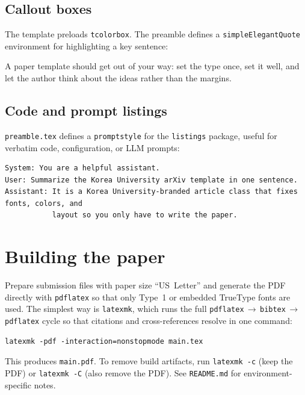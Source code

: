 \subsection{Callout boxes}
\label{sec:callout}

The template preloads \verb+tcolorbox+. The preamble defines a \verb+simpleElegantQuote+
environment for highlighting a key sentence:

\begin{simpleElegantQuote}
A paper template should get out of your way: set the type once, set it well, and
let the author think about the ideas rather than the margins.
\end{simpleElegantQuote}

\subsection{Code and prompt listings}
\label{sec:listings}

\verb+preamble.tex+ defines a \verb+promptstyle+ for the \verb+listings+ package,
useful for verbatim code, configuration, or LLM prompts:

\begin{lstlisting}[style=promptstyle]
System: You are a helpful assistant.
User: Summarize the Korea University arXiv template in one sentence.
Assistant: It is a Korea University-branded article class that fixes fonts, colors, and
           layout so you only have to write the paper.
\end{lstlisting}




\section{Building the paper}
\label{sec:building}

Prepare submission files with paper size ``US~Letter'' and generate the PDF
directly with \verb+pdflatex+ so that only Type~1 or embedded TrueType fonts are
used. The simplest way is \verb+latexmk+, which runs the full
\verb+pdflatex+\,$\rightarrow$\,\verb+bibtex+\,$\rightarrow$\,\verb+pdflatex+ cycle
so that citations and cross-references resolve in one command:
\begin{lstlisting}[style=promptstyle]
   latexmk -pdf -interaction=nonstopmode main.tex
\end{lstlisting}
This produces \verb+main.pdf+. To remove build artifacts, run
\verb+latexmk -c+ (keep the PDF) or \verb+latexmk -C+ (also remove the PDF). See
\verb+README.md+ for environment-specific notes.


